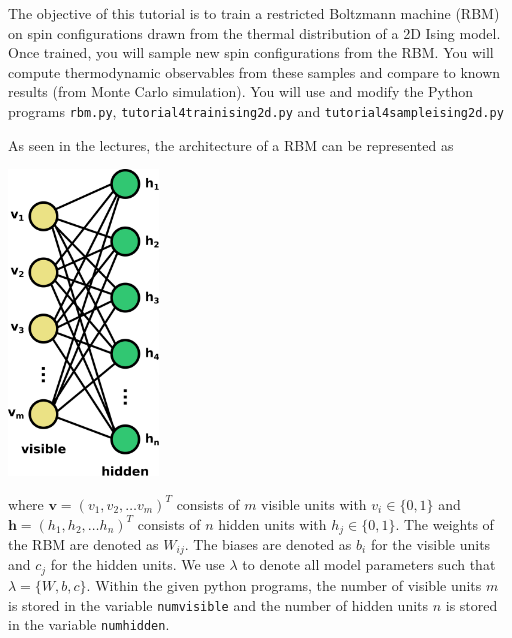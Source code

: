 \documentclass[letterpaper]{scrartcl}
\begin{document}

\vspace{-3cm}


\date{August 30, 2019}

\maketitle

The objective of this tutorial is to train a restricted Boltzmann machine (RBM) on spin configurations drawn from the thermal distribution
of a 2D Ising model.  Once trained, you will sample new spin configurations from the RBM.
You will compute thermodynamic observables from these samples and compare to known results (from Monte Carlo simulation).
You will use and modify the Python programs 
\texttt{rbm.py}, \texttt{tutorial4{\textunderscore}train{\textunderscore}ising2d.py} and 
\texttt{tutorial4{\textunderscore}sample{\textunderscore}ising2d.py} %

As seen in the lectures, the architecture of a RBM can be represented as
\begin{center}
\includegraphics[width=4cm]{RBM.pdf}
\end{center}
where $\mathbf{v} = \left(v_1, v_2, \ldots v_m\right)^T$ consists of $m$ visible units with $v_i \in \{0,1\}$ and $\mathbf{h} = \left(h_1, h_2, \ldots h_n\right)^T$ consists of $n$ hidden units with $h_j \in \{0,1\}$.
The weights of the RBM are denoted as $W_{ij}$. 
The biases are denoted as $b_i$ for the visible units and $c_j$ for the hidden units.
We use $\lambda$ to denote all model parameters such that $\lambda = \{ W, b, c \}$.
Within the given python programs, the number of visible units $m$ is stored in the variable \texttt{num{\textunderscore}visible}
and the number of hidden units $n$ is stored in the variable \texttt{num{\textunderscore}hidden}.
\end{document}
